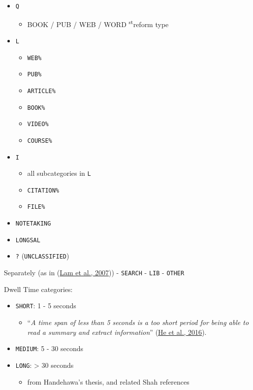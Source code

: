\documentclass[letterpaper, nobind]{templates/ociamthesis}
\providecommand{\tightlist}{%
  \setlength{\itemsep}{0pt}\setlength{\parskip}{0pt}}
\renewcommand{\st}{\textsuperscript{st}}
\begin{document}
\begin{itemize}
\tightlist
\item
  \texttt{Q}

  \begin{itemize}
  \tightlist
  \item
    BOOK / PUB / WEB / WORD \st{reform type}
  \end{itemize}
\item
  \texttt{L}

  \begin{itemize}
  \tightlist
  \item
    \texttt{WEB\%}
  \item
    \texttt{PUB\%}
  \item
    \texttt{ARTICLE\%}
  \item
    \texttt{BOOK\%}
  \item
    \texttt{VIDEO\%}
  \item
    \texttt{COURSE\%}
  \end{itemize}
\item
  \texttt{I}

  \begin{itemize}
  \tightlist
  \item
    all subcategories in \texttt{L}
  \item
    \texttt{CITATION\%}
  \item
    \texttt{FILE\%}
  \end{itemize}
\item
  \texttt{NOTETAKING}
\item
  \texttt{LONGSAL}
\item
  \texttt{?} (\texttt{UNCLASSIFIED})
\end{itemize}

Separately (as in (\protect\hyperlink{ref-lam2007session}{Lam et al., 2007}))
- \texttt{SEARCH}
- \texttt{LIB}
- \texttt{OTHER}

Dwell Time categories:

\begin{itemize}
\tightlist
\item
  \texttt{SHORT}: 1 - 5 seconds

  \begin{itemize}
  \tightlist
  \item
    ``\emph{A time span of less than 5 seconds is a too short period for being able to read a summary and extract information}'' (\protect\hyperlink{ref-he2016beyond}{He et al., 2016}).
  \end{itemize}
\item
  \texttt{MEDIUM}: 5 - 30 seconds
\item
  \texttt{LONG}: \textgreater{} 30 seconds

  \begin{itemize}
  \tightlist
  \item
    from Handehawa's thesis, and related Shah references
  \end{itemize}
\end{itemize}
\end{document}
